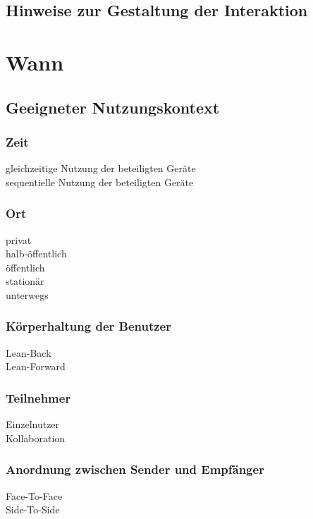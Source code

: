 \subsection*{Hinweise zur Gestaltung der Interaktion}
\designnotes


\section*{Wann}

\subsection*{Geeigneter Nutzungskontext}
\validcontext

\subsubsection*{Zeit}
\checkbox{\simultaneously} gleichzeitige Nutzung der beteiligten Geräte \\
\checkbox{\sequentially} sequentielle Nutzung der beteiligten Geräte

\subsubsection*{Ort}
\checkbox{\private} privat \\
\checkbox{\semipublic} halb-öffentlich \\
\checkbox{\public} öffentlich \\
\checkbox{\stationary} stationär \\
\checkbox{\onthego} unterwegs 

\subsubsection*{Körperhaltung der Benutzer}
\checkbox{\leanback} Lean-Back \\
\checkbox{\leanforward} Lean-Forward 

\subsubsection*{Teilnehmer}
\checkbox{\single} Einzelnutzer \\
\checkbox{\collaboration} Kollaboration

\subsubsection*{Anordnung zwischen Sender und Empfänger}
\checkbox{\facetoface} Face-To-Face \\
\checkbox{\sidetoside} Side-To-Side

